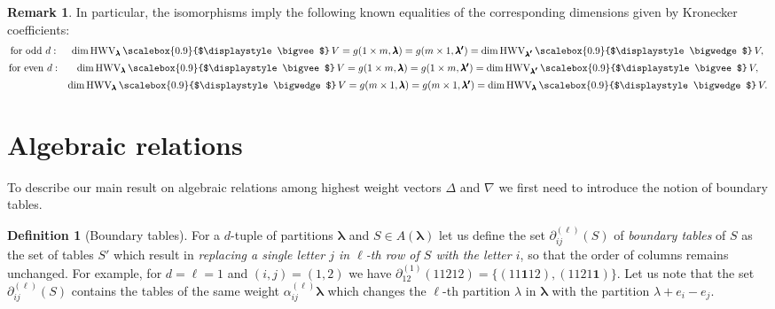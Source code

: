 \documentclass[12pt, reqno]{amsart}
\theoremstyle{definition}
\newtheorem{definition}[theorem]{Definition}
\newtheorem{remark}{Remark}[section]
\let\oldbigwedge\bigwedge
\let\oldbigvee\bigvee
\renewcommand{\bigwedge}{
  \mathop{
    \vcenter{
      \hbox{\scalebox{0.9}{$\displaystyle\oldbigwedge$}}
    }
  }
}
\renewcommand{\bigvee}{
  \mathop{
    \vcenter{
      \hbox{\scalebox{0.9}{$\displaystyle\oldbigvee$}}
    }
  }
}
\begin{document}
\begin{remark}
In particular, the isomorphisms imply the following known equalities of the corresponding dimensions given by Kronecker coefficients: 
$$
\begin{matrix}
    \text{for odd }d:
    & \dim \mathrm{HWV}_{\pmb{\lambda}} \bigvee  V %
    = g(1 \times m, \pmb{\lambda}) = g(m \times 1, \pmb{\lambda'}) = \dim \mathrm{HWV}_{\pmb{\lambda'}} \bigwedge V, %
    \vspace{0.5em}
    \\
    \text{for even }d:
    & \dim  \mathrm{HWV}_{\pmb{\lambda}} \bigvee  V %
    = g(1 \times m, \pmb{\lambda}) = g(1 \times m, \pmb{\lambda'}) = \dim  \mathrm{HWV}_{\pmb{\lambda'}} \bigvee  V, %
    \vspace{0.5em}
    \\
    ~&\dim  \mathrm{HWV}_{\pmb{\lambda}} \bigwedge  V %
    = g(m \times 1, \pmb{\lambda}) = g(m \times 1, \pmb{\lambda'}) = \dim  \mathrm{HWV}_{\pmb{\lambda}} \bigwedge  V. %
\end{matrix}
$$
\end{remark}


\section{Algebraic relations}\label{sec:linear}
To describe our main result on algebraic relations among highest weight vectors $\Delta$ and $\nabla$ we first need to introduce the notion of boundary tables. 
\begin{definition}[Boundary tables]
    For a $d$-tuple of partitions $\pmb{\lambda}$ and %
    $S \in A(\pmb{\lambda})$ let us define the set $\partial^{(\ell)}_{i j}(S)$ of \textit{boundary tables} of $S$ as %
    the set of tables $S'$ which result in \textit{replacing a single letter $j$ in $\ell$-th row of $S$ with the letter $i$}, so that the order of columns remains unchanged. For example, for $d = \ell = 1$ and $(i, j) = (1,2)$ we have %
    $\partial^{(1)}_{1 2}(11212) = \{ (11\mathbf{1}12), (1121\mathbf{1}) \}$.
    Let us note that the set $\partial^{(\ell)}_{i j}(S)$ contains the tables of the same weight $\alpha^{(\ell)}_{i j} \pmb{\lambda}$ which changes the $\ell$-th partition $\lambda$ in  $\pmb{\lambda}$ with the partition $\lambda + e_i - e_j$. 
\end{definition}
\end{document}

